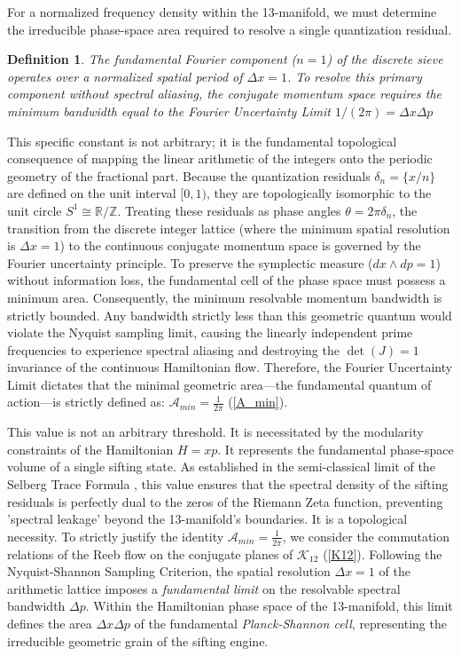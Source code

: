 \documentclass[sn-mathphys-num, pdflatex]{sn-jnl}
\newtheorem{definition}[theorem]{Definition}
\begin{document}
For a normalized frequency density within the 13-manifold, we must determine the irreducible phase-space area required to resolve a single quantization residual. 
\begin{definition}
The fundamental Fourier component ($n=1$) of the discrete sieve operates over a normalized spatial period of $\Delta x = 1$. To resolve this primary component without spectral aliasing, the conjugate momentum space requires the minimum bandwidth  equal to \label{Fourier Uncertainty Limit} the Fourier Uncertainty Limit $1/(2\pi)=\Delta x\Delta p$ 
\end{definition}
This specific constant is not arbitrary; it is the fundamental topological consequence of mapping the linear arithmetic of the integers onto the periodic geometry of the fractional part. Because the quantization residuals $\delta_n = \{x/n\}$ are defined on the unit interval $[0, 1)$, they are topologically isomorphic to the unit circle $S^1 \cong \mathbb{R}/\mathbb{Z}$. Treating these residuals as phase angles $\theta = 2\pi \delta_n$, the transition from the discrete integer lattice (where the minimum spatial resolution is $\Delta x = 1$) to the continuous conjugate momentum space is governed by the Fourier uncertainty principle. To preserve the symplectic measure ($dx \wedge dp = 1$) without information loss, the fundamental cell of the phase space must possess a minimum area. Consequently, the minimum resolvable momentum bandwidth is strictly bounded. Any bandwidth strictly less than this geometric quantum would violate the Nyquist sampling limit, causing the linearly independent prime frequencies to experience spectral aliasing \cite{shannon1949communication} and destroying the $\det(J)=1$ invariance of the continuous Hamiltonian flow. Therefore, the Fourier Uncertainty Limit dictates that the minimal geometric area---the fundamental quantum of action---is strictly defined as:
$\mathcal{A}_{min} = \frac{1}{2\pi}$ (\ref{A_min}).

This value is not an arbitrary threshold. It is necessitated by the modularity constraints of the Hamiltonian $H=xp$. It represents the fundamental phase-space volume of a single sifting state. As established in the semi-classical limit of the Selberg Trace Formula \cite{berry1999hxp, berry1999riemann}, this value ensures that the spectral density of the sifting residuals is perfectly dual to the zeros of the Riemann Zeta function, preventing 'spectral leakage' beyond the 13-manifold's boundaries. It is a topological necessity. To strictly justify the identity $\mathcal{A}_{min} = \frac{1}{2\pi}$, we consider the commutation relations of the Reeb flow on the conjugate planes of $\mathcal{K}_{12}$ (\ref{K12}). Following the Nyquist-Shannon Sampling Criterion, the spatial resolution $\Delta x = 1$ of the arithmetic lattice imposes a \textit{fundamental limit} on the resolvable spectral bandwidth $\Delta p$. Within the Hamiltonian phase space of the 13-manifold, this limit defines the area $\Delta x\Delta p$ of the fundamental \textit{Planck-Shannon cell}, representing the irreducible geometric grain of the sifting engine.  
\end{document}

